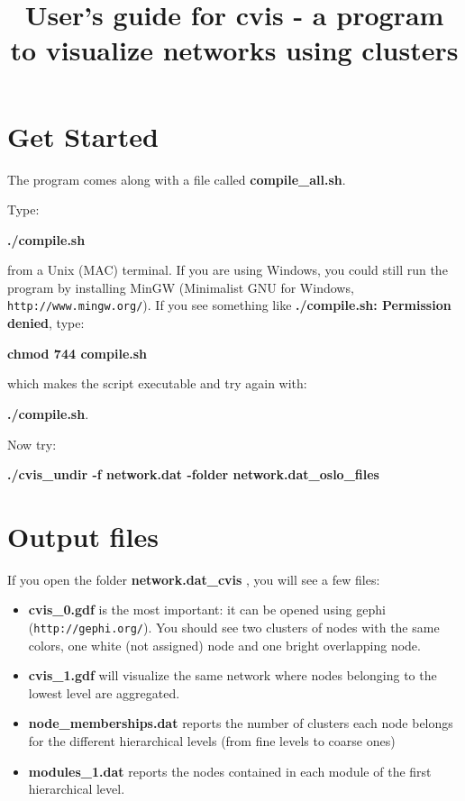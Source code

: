 \documentclass[11pt]{article}
\title{User's guide for cvis - a program to visualize networks using clusters}
\begin{document}
\maketitle



\section{Get Started}

The program comes along with a file called \textbf{compile\_all.sh}.

Type:

{ \textbf{./compile.sh} }

from a Unix (MAC) terminal. If you are using Windows, you could still run
the program by installing MinGW
(Minimalist GNU for Windows, {\tt http://www.mingw.org/}).
If you see something like \textbf{./compile.sh: Permission denied}, type:

\textbf{chmod 744 compile.sh} 

which makes the script executable and try again with:

\textbf{./compile.sh}. 

Now try:

{ \textbf{./cvis\_undir -f network.dat -folder network.dat\_oslo\_files} }




\section{Output files}

If you open the folder \textbf{network.dat\_cvis }, you will see a few files:

\begin{itemize}
  \item \textbf{cvis\_0.gdf} is the most important: it can be opened using gephi ({\tt http://gephi.org/}). You should see two clusters of nodes with the same colors, one white (not assigned) node and one bright overlapping node. 
  \item  \textbf{cvis\_1.gdf} will visualize the same network where nodes belonging to the lowest level are aggregated.
  \item \textbf{node\_memberships.dat} reports the number of clusters each node belongs for the different hierarchical levels (from fine levels to coarse ones)
  \item \textbf{modules\_1.dat} reports the nodes contained in each module of the first hierarchical level. 
\end{itemize}
\end{document}
